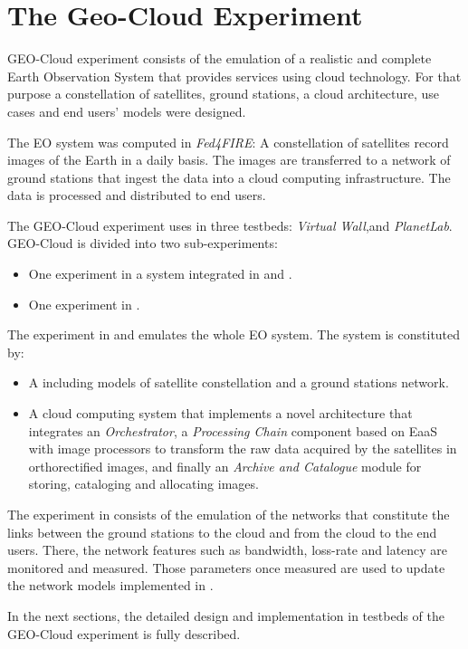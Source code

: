 
\chapter{The Geo-Cloud Experiment}
\label{chap:geocloud-experiment}
 GEO-Cloud experiment consists of the emulation of a realistic and complete Earth Observation System that provides services using cloud technology. For that purpose a constellation of satellites, ground stations, a cloud architecture, use cases and end users' models were designed.

The \ac{EO} system was computed in \emph{Fed4FIRE}: A constellation of
satellites record images of the Earth in a daily basis. The images are
transferred to a network of ground stations that ingest the data into a cloud computing infrastructure. The data is processed and distributed to end users.

The GEO-Cloud experiment uses in three testbeds: \emph{Virtual Wall},\bonfire and
\emph{PlanetLab}. GEO-Cloud is divided into two sub-experiments:
\begin{itemize}
\item One experiment in a system integrated in \vw and \bonfire.
\item One experiment in \pl.
\end{itemize}

The experiment in \vw and \bonfire emulates the whole \ac{EO} system. The system is constituted by:

\begin{itemize}
\item A \sss including models of satellite constellation and a ground stations
  network.
\item A cloud computing system that implements a novel architecture that
  integrates an \emph{Orchestrator}, a \emph{Processing Chain} component
  based on \ac{EaaS}  with image processors to transform the raw data acquired
  by the satellites in orthorectified images, and finally an \emph{Archive and Catalogue}
  module for storing, cataloging and allocating images.
\end{itemize}

The experiment in \pl consists of the emulation of the networks that constitute
the links between the ground stations to the cloud and from the cloud to the end
users. There, the network features such as bandwidth, loss-rate and latency are monitored and measured. Those parameters once measured are used to update the
network models implemented in \vw.

In the next sections, the detailed design and implementation in testbeds of the GEO-Cloud experiment is fully
described. 
















